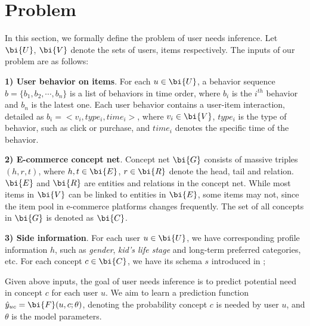 \section{Problem}
\label{sec:problem}

In this section, we formally define the problem of user needs inference.
Let $\bi{U}$, $\bi{V}$ denote the sets of users, items respectively.
The inputs of our problem are as follows:

\noindent
\textbf{1) User behavior on items}. For each $u\in \bi{U}$,  a behavior sequence 
$b= \{b_1, b_2, \cdots, b_n\}$ is a list of behaviors in time order, 
where $b_i$ is the $i^{th}$ behavior and $b_n$ is the latest one. 
Each user behavior contains a user-item interaction, 
detailed as $b_i = <v_i, type_i, time_i>$, where $v_i \in \bi{V}$, 
$type_i$ is the type of behavior, such as click or purchase, and
$time_i$ denotes the specific time of the behavior.

\noindent
\textbf{2) E-commerce concept net}. Concept net $\bi{G}$ consists of massive triples $(h, r, t)$, 
where $h, t\in \bi{E}$, $r\in \bi{R}$ denote the head, tail and relation.
$\bi{E}$ and $\bi{R}$ are entities and relations in the concept net.
While most items in $\bi{V}$ can be linked to entities in $\bi{E}$, 
some items may not, since the item pool in e-commerce platforms changes frequently. 
The set of all concepts in $\bi{G}$ is denoted as $\bi{C}$.

\noindent
\textbf{3) Side information}. 
For each user $u\in \bi{U}$, we have corresponding profile information $h$, 
such as \textit{gender}, \textit{kid's life stage} and long-term preferred categories, etc.
For each concept $c\in \bi{C}$, we have its schema $s$ introduced in ;


Given above inputs, the goal of user needs inference is to predict potential need in concept $c$ for each user $u$. We aim to learn a prediction function $\hat y_{uc} = \bi{F}(u, c; \theta)$, denoting the probability concept $c$ is needed by user $u$, and $\theta$ is the model parameters.

